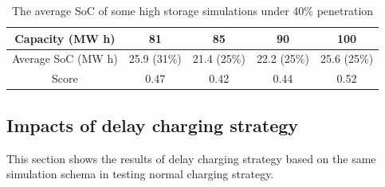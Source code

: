 \documentclass[12pt,a4paper]{report}
\begin{document}
            \begin{table}[ht]
                \centering
                \begin{tabulary}{\linewidth}{C C C C C}
                    \hline
                    Capacity (MW h) & 81 & 85 & 90 & 100 \\ \hline
                    Average SoC (MW h) & 25.9 (31\%) & 21.4 (25\%) & 22.2 (25\%) & 25.6 (25\%) \\ \hline
                    Score & 0.47 & 0.42 & 0.44 & 0.52 \\
                    \hline
                \end{tabulary}
                \caption{The average SoC of some high storage simulations under 40\% penetration}
                \label{table_high_storage_40}
            \end{table}

            \subsection{Impacts of delay charging strategy}
            This section shows the results of delay charging strategy based on the same simulation schema in testing normal charging strategy.
\end{document}
